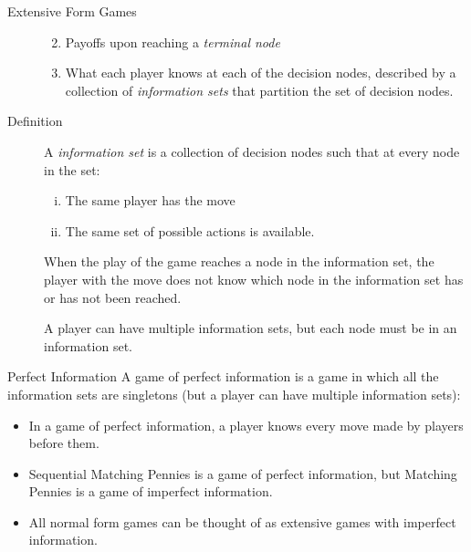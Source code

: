 \documentclass[10pt]{extarticle}
\begin{document}
\begin{problem}{Extensive Form Games}
\begin{description}
\begin{enumerate}[(1)]
\begin{enumerate}[(i)]
            \end{enumerate}
          \item Payoffs upon reaching a \textit{terminal node}
          \item What each player knows at each of the decision nodes, described by a collection of \textit{information sets} that partition the set of decision nodes.
        \end{enumerate}
      \item[Definition] A \textit{information set} is a collection of decision nodes such that at every node in the set:
        \begin{enumerate}[(i)]
          \item The same player has the move
          \item The same set of possible actions is available.
        \end{enumerate}
        When the play of the game reaches a node in the information set, the player with the move does not know which node in the information set has or has not been reached.\newline

        A player can have multiple information sets, but each node must be in an information set.
    \end{description}
  \end{problem}
  \begin{problem}{Perfect Information}
    A game of perfect information is a game in which all the information sets are singletons (but a player can have multiple information sets):
    \begin{itemize}
      \item In a game of perfect information, a player knows every move made by players before them.
      \item Sequential Matching Pennies is a game of perfect information, but Matching Pennies is a game of imperfect information.
      \item All normal form games can be thought of as extensive games with imperfect information.
    \end{itemize}
  \end{problem}
\end{document}
